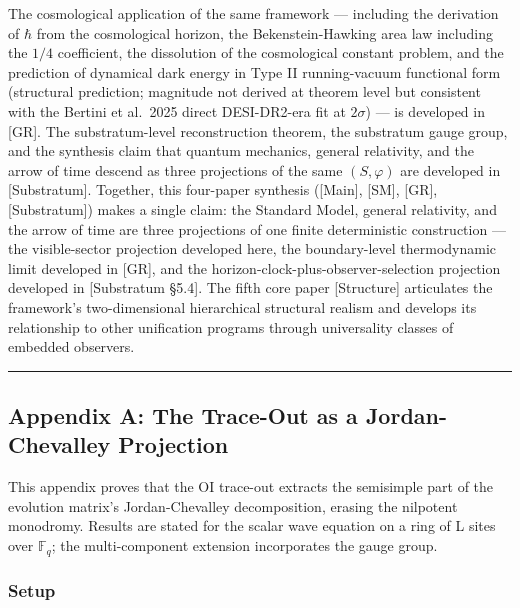 \documentclass[
]{article}
\begin{document}
The cosmological application of the same framework --- including the
derivation of \(\hbar\) from the cosmological horizon, the
Bekenstein-Hawking area law including the \(1/4\) coefficient, the
dissolution of the cosmological constant problem, and the prediction of
dynamical dark energy in Type II running-vacuum functional form
(structural prediction; magnitude not derived at theorem level but
consistent with the Bertini et al.~2025 direct DESI-DR2-era fit at
\(2\sigma\)) --- is developed in {[}GR{]}. The substratum-level
reconstruction theorem, the substratum gauge group, and the synthesis
claim that quantum mechanics, general relativity, and the arrow of time
descend as three projections of the same \((S, \varphi)\) are developed
in {[}Substratum{]}. Together, this four-paper synthesis ({[}Main{]},
{[}SM{]}, {[}GR{]}, {[}Substratum{]}) makes a single claim: the Standard
Model, general relativity, and the arrow of time are three projections
of one finite deterministic construction --- the visible-sector
projection developed here, the boundary-level thermodynamic limit
developed in {[}GR{]}, and the horizon-clock-plus-observer-selection
projection developed in {[}Substratum §5.4{]}. The fifth core paper
{[}Structure{]} articulates the framework's two-dimensional hierarchical
structural realism and develops its relationship to other unification
programs through universality classes of embedded observers.

\begin{center}\rule{0.5\linewidth}{0.5pt}\end{center}

\hypertarget{appendix-a-the-trace-out-as-a-jordan-chevalley-projection}{%
\subsection{Appendix A: The Trace-Out as a Jordan-Chevalley
Projection}\label{appendix-a-the-trace-out-as-a-jordan-chevalley-projection}}

This appendix proves that the OI trace-out extracts the semisimple part
of the evolution matrix's Jordan-Chevalley decomposition, erasing the
nilpotent monodromy. Results are stated for the scalar wave equation on
a ring of L sites over \(\mathbb{F}_q\); the multi-component extension
incorporates the gauge group.

\hypertarget{setup}{%
\subsubsection{Setup}\label{setup}}
\end{document}
